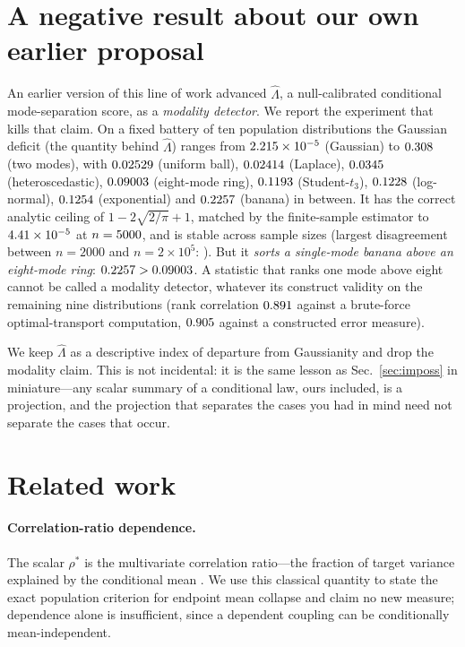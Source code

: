 \documentclass{article}
\theoremstyle{plain}
\newcommand{\cL}{\hat\Lambda}
\begin{document}
\section{A negative result about our own earlier proposal}
\label{sec:negative}

An earlier version of this line of work advanced $\cL$, a null-calibrated conditional
mode-separation score, as a \emph{modality detector}. We report the experiment that
kills that claim. On a fixed battery of ten population distributions the Gaussian
deficit (the quantity behind $\cL$) ranges from $2.215\times 10^{-5}$ (Gaussian) to
$0.308$ (two modes), with $0.02529$ (uniform ball), $0.02414$ (Laplace),
$0.0345$ (heteroscedastic), $0.09003$ (eight-mode ring), $0.1193$
(Student-$t_3$), $0.1228$ (log-normal), $0.1254$ (exponential) and
$0.2257$ (banana) in between. It has the correct analytic ceiling of
$1-2\sqrt{2/\pi}+1$, matched by the finite-sample estimator to $4.41\times 10^{-5}$ at
$n=5000$, and is stable across sample sizes (largest disagreement between
$n=2000$ and $n=2\times10^{5}$: \LamConsistencyMaxDiff). But it \emph{sorts a
single-mode banana above an eight-mode ring}: $0.2257>0.09003$. A statistic
that ranks one mode above eight cannot be called a modality detector, whatever its
construct validity on the remaining nine distributions (rank correlation
$0.891$ against a brute-force optimal-transport computation,
$0.905$ against a constructed error measure).

We keep $\cL$ as a descriptive index of departure from Gaussianity and drop the modality
claim. This is not incidental: it is the same lesson as Sec.~\ref{sec:imposs} in
miniature---any scalar summary of a conditional law, ours included, is a projection, and
the projection that separates the cases you had in mind need not separate the cases that
occur.

\section{Related work}
\label{sec:related}

\paragraph{Correlation-ratio dependence.} The scalar $\rho^\ast$ is the multivariate
correlation ratio---the fraction of target variance explained by the conditional mean
\citep{renyi1959,sampson1984}. We use this classical quantity to state the exact population
criterion for endpoint mean collapse and claim no new measure; dependence alone is
insufficient, since a dependent coupling can be conditionally mean-independent.
\end{document}
